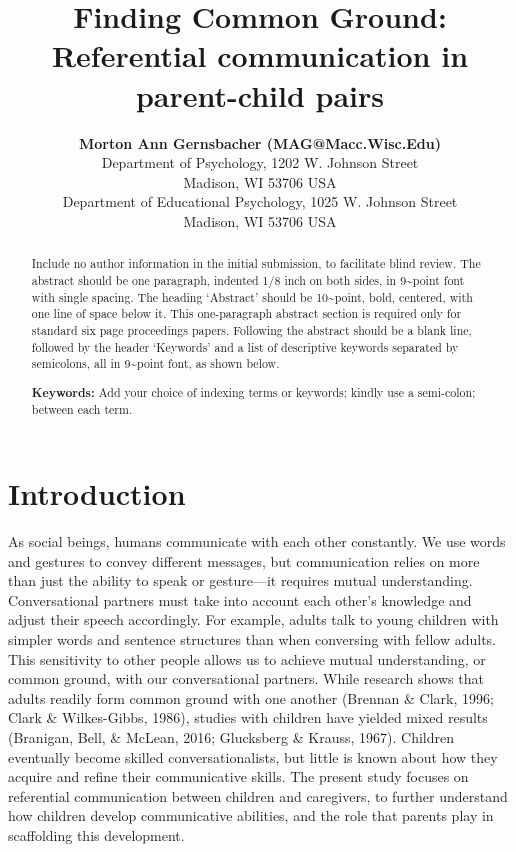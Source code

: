 \documentclass[10pt, letterpaper]{article}
\title{Finding Common Ground: Referential communication in parent-child pairs}
\author{{\large \bf Morton Ann Gernsbacher (MAG@Macc.Wisc.Edu)} \\ Department of Psychology, 1202 W. Johnson Street \\ Madison, WI 53706 USA \AND {\large \bf Sharon J.~Derry (SDJ@Macc.Wisc.Edu)} \\ Department of Educational Psychology, 1025 W. Johnson Street \\ Madison, WI 53706 USA}
\begin{document}
\maketitle

\begin{abstract}
Include no author information in the initial submission, to facilitate
blind review. The abstract should be one paragraph, indented 1/8 inch on
both sides, in 9\textasciitilde{}point font with single spacing. The
heading `Abstract' should be 10\textasciitilde{}point, bold, centered,
with one line of space below it. This one-paragraph abstract section is
required only for standard six page proceedings papers. Following the
abstract should be a blank line, followed by the header `Keywords' and a
list of descriptive keywords separated by semicolons, all in
9\textasciitilde{}point font, as shown below.

\textbf{Keywords:}
Add your choice of indexing terms or keywords; kindly use a semi-colon;
between each term.
\end{abstract}

\hypertarget{introduction}{%
\section{Introduction}\label{introduction}}

As social beings, humans communicate with each other constantly. We use
words and gestures to convey different messages, but communication
relies on more than just the ability to speak or gesture---it requires
mutual understanding. Conversational partners must take into account
each other's knowledge and adjust their speech accordingly. For example,
adults talk to young children with simpler words and sentence structures
than when conversing with fellow adults. This sensitivity to other
people allows us to achieve mutual understanding, or common ground, with
our conversational partners. While research shows that adults readily
form common ground with one another (Brennan \& Clark, 1996; Clark \&
Wilkes-Gibbs, 1986), studies with children have yielded mixed results
(Branigan, Bell, \& McLean, 2016; Glucksberg \& Krauss, 1967). Children
eventually become skilled conversationalists, but little is known about
how they acquire and refine their communicative skills. The present
study focuses on referential communication between children and
caregivers, to further understand how children develop communicative
abilities, and the role that parents play in scaffolding this
development.
\end{document}
